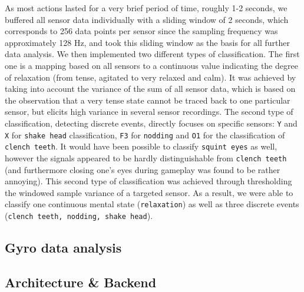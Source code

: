 \documentclass{utue} %
\begin{document}
As most actions lasted for a very brief period of time, roughly 1-2 seconds, we buffered all sensor data individually with a sliding window of 2 seconds, which corresponds to 256 data points per sensor since the sampling frequency was approximately 128 Hz, and took this sliding window as the basis for all further data analysis. We then implemented two different types of classification. The first one is a mapping based on all sensors to a continuous value indicating the degree of relaxation (from tense, agitated to very relaxed and calm). It was achieved by taking into account the variance of the sum of all sensor data, which is based on the observation that a very tense state cannot be traced back to one particular sensor, but elicits high variance in several sensor recordings. The second type of classification, detecting discrete events, directly focuses on specific sensors: 
\texttt{Y} and \texttt{X} for \texttt{shake head} classification, \texttt{F3} for \texttt{nodding} and \texttt{O1} for the classification of \texttt{clench teeth}. It would have been possible to classify \texttt{squint eyes} as well, however the signals appeared to be hardly distinguishable from \texttt{clench teeth} (and furthermore closing one's eyes during gameplay was found to be rather annoying). This second type of classification was achieved through thresholding the windowed sample variance of a targeted sensor. As a result, we were able to classify one continuous mental state (\texttt{relaxation}) as well as three discrete events (\texttt{clench teeth, nodding, shake head}).

\subsection{Gyro data analysis}

\subsection{Architecture \& Backend}
\end{document}

